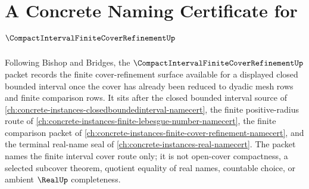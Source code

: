 \chapter{A Concrete Naming Certificate for $\CompactIntervalFiniteCoverRefinementUp$}
\label{ch:concrete-instances-compact-interval-finite-cover-refinement-namecert}

Following Bishop and Bridges, the $\CompactIntervalFiniteCoverRefinementUp$ packet records the finite cover-refinement surface available for a displayed closed bounded interval once the cover has already been reduced to dyadic mesh rows and finite comparison rows. It sits after the closed bounded interval source of \autoref{ch:concrete-instances-closedboundedinterval-namecert}, the finite positive-radius route of \autoref{ch:concrete-instances-finite-lebesgue-number-namecert}, the finite comparison packet of \autoref{ch:concrete-instances-finite-cover-refinement-namecert}, and the terminal real-name seal of \autoref{ch:concrete-instances-real-namecert}. The packet names the finite interval cover route only; it is not open-cover compactness, a selected subcover theorem, quotient equality of real names, countable choice, or ambient $\RealUp$ completeness.

